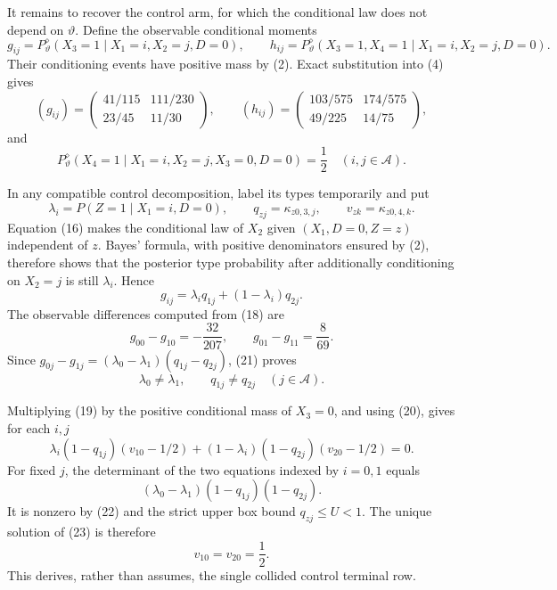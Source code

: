It remains to recover the control arm, for which the conditional law does not depend on \(\vartheta\).  Define the observable conditional moments
\[
 g_{ij}=P^{\diamond}_{\vartheta}(X_3=1\mid X_1=i,X_2=j,D=0),
 \qquad
 h_{ij}=P^{\diamond}_{\vartheta}(X_3=1,X_4=1\mid X_1=i,X_2=j,D=0).
 \tag{17}
\]
Their conditioning events have positive mass by (2).  Exact substitution into (4) gives
\[
 (g_{ij})=
 \begin{pmatrix}41/115&111/230\\[2pt]23/45&11/30\end{pmatrix},
 \qquad
 (h_{ij})=
 \begin{pmatrix}103/575&174/575\\[2pt]49/225&14/75\end{pmatrix},
 \tag{18}
\]
and
\[
 P^{\diamond}_{\vartheta}(X_4=1\mid X_1=i,X_2=j,X_3=0,D=0)=\frac12
 \quad(i,j\in\mathcal A).
 \tag{19}
\]

In any compatible control decomposition, label its types temporarily and put
\[
 \lambda_i=P(Z=1\mid X_1=i,D=0),
 \qquad q_{zj}=\kappa_{z0,3,j},
 \qquad v_{zk}=\kappa_{z0,4,k}.
\]
Equation (16) makes the conditional law of \(X_2\) given \((X_1,D=0,Z=z)\) independent of \(z\).  Bayes' formula, with positive denominators ensured by (2), therefore shows that the posterior type probability after additionally conditioning on \(X_2=j\) is still \(\lambda_i\).  Hence
\[
 g_{ij}=\lambda_iq_{1j}+(1-\lambda_i)q_{2j}.
 \tag{20}
\]
The observable differences computed from (18) are
\[
 g_{00}-g_{10}=-\frac{32}{207},
 \qquad
 g_{01}-g_{11}=\frac8{69}.
 \tag{21}
\]
Since \(g_{0j}-g_{1j}=(\lambda_0-\lambda_1)(q_{1j}-q_{2j})\), (21) proves
\[
 \lambda_0\ne\lambda_1,
 \qquad q_{1j}\ne q_{2j}\quad(j\in\mathcal A).
 \tag{22}
\]

Multiplying (19) by the positive conditional mass of \(X_3=0\), and using (20), gives for each \(i,j\)
\[
 \lambda_i(1-q_{1j})(v_{10}-1/2)
 +(1-\lambda_i)(1-q_{2j})(v_{20}-1/2)=0.
 \tag{23}
\]
For fixed \(j\), the determinant of the two equations indexed by \(i=0,1\) equals
\[
 (\lambda_0-\lambda_1)(1-q_{1j})(1-q_{2j}).
 \tag{24}
\]
It is nonzero by (22) and the strict upper box bound \(q_{zj}\le U<1\).  The unique solution of (23) is therefore
\[
 v_{10}=v_{20}=\frac12.
 \tag{25}
\]
This derives, rather than assumes, the single collided control terminal row.

